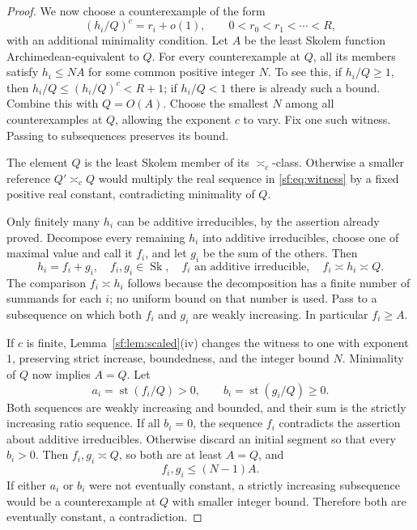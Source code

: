 \documentclass[11pt]{article}
\theoremstyle{definition}
\theoremstyle{remark}
\newcommand{\Sk}{\operatorname{Sk}}
\newcommand{\st}{\operatorname{st}}
\newcommand{\arch}{\mathrel{\asymp}}
\numberwithin{equation}{section}
\begin{document}
\begin{proof}
We now choose a counterexample of the form
\begin{equation}
 (h_i/Q)^c=r_i+o(1),\qquad 0<r_0<r_1<\cdots<R,
 \label{sf:eq:witness}
\end{equation}
with an additional minimality condition. Let $A$ be the least Skolem
function Archimedean-equivalent to $Q$. For every counterexample
at $Q$, all its members satisfy $h_i\le NA$ for some common
positive integer $N$. To see this, if $h_i/Q\ge1$, then
$h_i/Q\le(h_i/Q)^c<R+1$; if $h_i/Q<1$ there is already such
a bound. Combine this with $Q=O(A)$. Choose the smallest $N$
among all counterexamples at $Q$, allowing the exponent $c$ to vary.
Fix one such witness. Passing to subsequences preserves its bound.

The element $Q$ is the least Skolem member of its $\arch_c$-class.
Otherwise a smaller reference $Q'\arch_c Q$ would multiply the
real sequence in \eqref{sf:eq:witness} by a fixed positive real constant,
contradicting minimality of $Q$.

Only finitely many $h_i$ can be additive irreducibles, by the assertion
already proved. Decompose every remaining $h_i$ into additive irreducibles,
choose one of maximal value and call it $f_i$, and let $g_i$ be the
sum of the others. Then
\begin{equation}
 h_i=f_i+g_i,\quad f_i,g_i\in\Sk,\quad
 f_i\text{ an additive irreducible},\quad f_i\arch h_i\arch Q.
 \label{sf:eq:split}
\end{equation}
The comparison $f_i\arch h_i$ follows because the decomposition
has a finite number of summands for each $i$; no uniform bound on
that number is used. Pass to a subsequence on which both $f_i$ and
$g_i$ are weakly increasing. In particular $f_i\ge A$.

If $c$ is finite, Lemma~\ref{sf:lem:scaled}(iv) changes the witness
to one with exponent $1$, preserving strict increase, boundedness,
and the integer bound $N$. Minimality of $Q$ now implies $A=Q$.
Let
\[
 a_i=\st(f_i/Q)>0,\qquad b_i=\st(g_i/Q)\ge0.
\]
Both sequences are weakly increasing and bounded, and their sum is
the strictly increasing ratio sequence. If all $b_i=0$, the
sequence $f_i$ contradicts the assertion about additive irreducibles.
Otherwise discard an initial segment so that every $b_i>0$.
Then $f_i,g_i\arch Q$, so both are at least $A=Q$, and
\[
 f_i,g_i\le(N-1)A.
\]
If either $a_i$ or $b_i$ were not eventually constant, a strictly
increasing subsequence would be a counterexample at $Q$ with smaller
integer bound. Therefore both are eventually constant, a contradiction.


\end{proof}
\end{document}
